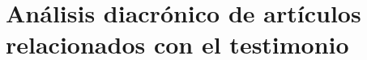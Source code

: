 \section{Análisis diacrónico de artículos relacionados con el testimonio}



\setcounter{subsection}{1}


\setcounter{subsection}{2}


\setcounter{subsection}{3}


\setcounter{subsection}{4}


\setcounter{subsection}{5}


\setcounter{subsection}{6}

